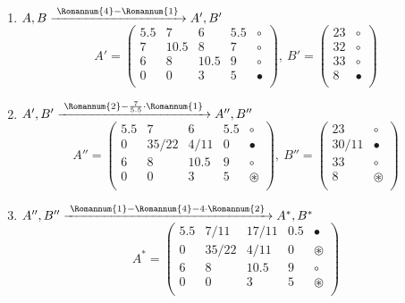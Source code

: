 \documentclass[a4paper,14pt]{extarticle} %
\begin{document}
\begin{enumerate}[Крок 1:]
    \item $ A,B \xrightarrow[]{\text{ \Romannum{4}}-\text{\Romannum{1} }} A',B' $
    \[ A' =
        \begin{pmatrix}
            5.5 & 7 & 6 & 5.5 & \circ \\
            7 & 10.5 & 8 & 7 & \circ \\
            6 & 8 & 10.5 & 9 & \circ \\
            0 & 0 & 3 & 5 & \bullet \\
        \end{pmatrix},\
        B' = 
        \begin{pmatrix}
            23 & \circ \\
            32 & \circ \\
            33 & \circ \\
            8 & \bullet \\
        \end{pmatrix}
    \]
    \item $ A',B' \xrightarrow[]{\text{ \Romannum{2}}-\frac{7}{5.5}\cdot\text{\Romannum{1} }} A'',B'' $
    \[ A'' =
        \begin{pmatrix}
            5.5 & 7 & 6 & 5.5 & \circ \\
            0 & 35/22 & 4/11 & 0 & \bullet \\
            6 & 8 & 10.5 & 9 & \circ \\
            0 & 0 & 3 & 5 & \circledast \\
        \end{pmatrix},\
        B'' = 
        \begin{pmatrix}
            23 & \circ \\
            30/11 & \bullet \\
            33 & \circ \\
            8 & \circledast \\
        \end{pmatrix}
    \]
    \item $ A'',B'' \xrightarrow[]{\text{ \Romannum{1}}-\text{\Romannum{4}}-4\cdot\text{\Romannum{2} }} A^*,B^* $
    \[ A^* =
        \begin{pmatrix}
            5.5 & 7/11 & 17/11 & 0.5 & \bullet \\
            0 & 35/22 & 4/11 & 0 & \circledast \\
            6 & 8 & 10.5 & 9 & \circ \\
            0 & 0 & 3 & 5 & \circledast \\

\end{pmatrix}\]
\end{enumerate}
\end{document}
